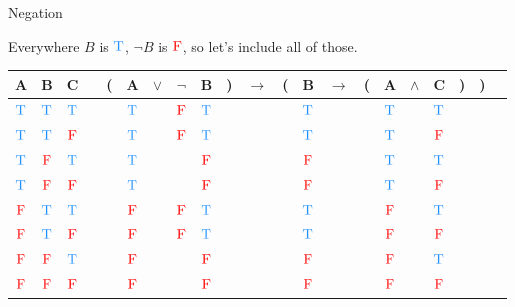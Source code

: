 \documentclass[
  ignorenonframetext,
]{beamer}
\renewcommand{\,}{\text{, }}
\def\True{\textcolor{dodgerblue}{\text{T}}}
\def\False{\textcolor{red}{\text{F}}}
\begin{document}
\begin{frame}{Negation}
\protect\hypertarget{negation}{}

Everywhere \(B\) is \(\True\), \(\neg B\) is \(\False\), so let's
include all of those.

\begin{center}
\bigskip
\begin{tabular}{@{ }c@{ }@{ }c@{ }@{ }c | c@{ }@{}c@{}@{ }c@{ }@{ }c@{ }@{ }c@{ }@{ }c@{ }@{}c@{}@{ }c@{ }@{}c@{}@{ }c@{ }@{ }c@{ }@{}c@{}@{ }c@{ }@{ }c@{ }@{ }c@{ }@{}c@{}@{}c@{}@{ }c}
A & B & C &  & ( & A & $\vee$ & $\neg$ & B & ) & $\rightarrow$ & ( & B & $\rightarrow$ & ( & A & $\wedge$ & C & ) & ) & \\
\hline 
 $\True$ & $\True$ & $\True$ &  &  & $\True$ && $\False$ & $\True$ &  &&  & $\True$ &&  & $\True$ && $\True$ &  &  & \\
 $\True$ & $\True$ & $\False$ &  &  & $\True$ && $\False$ & $\True$ &  &&  & $\True$ &&  & $\True$ && $\False$ &  &  & \\
 $\True$ & $\False$ & $\True$ &  &  & $\True$ &&& $\False$ &  &&  & $\False$ &&  & $\True$ && $\True$ &  &  & \\
 $\True$ & $\False$ & $\False$ &  &  & $\True$ &&& $\False$ &  &&  & $\False$ &&  & $\True$ && $\False$ &  &  & \\
 $\False$ & $\True$ & $\True$ &  &  & $\False$ && $\False$ & $\True$ &  &&  & $\True$ &&  & $\False$ && $\True$ &  &  & \\
 $\False$ & $\True$ & $\False$ &  &  & $\False$ && $\False$ & $\True$ &  &&  & $\True$ &&  & $\False$ && $\False$ &  &  & \\
 $\False$ & $\False$ & $\True$ &  &  & $\False$ &&& $\False$ &  &&  & $\False$ &&  & $\False$ && $\True$ &  &  & \\
 $\False$ & $\False$ & $\False$ &  &  & $\False$ &&& $\False$ &  &&  & $\False$ &&  & $\False$ && $\False$ &  &  & \\
\end{tabular}
\bigskip
\end{center}

\end{frame}
\end{document}

